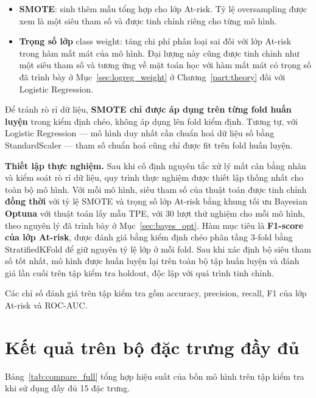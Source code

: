 \documentclass[a4paper]{report}
\newcommand{\code}[1]{{\ttfamily\def\_{\textunderscore\discretionary{}{}{}}#1}}
\def\code#1{#1}%
\def\_{ }%
\begin{document}
\begin{itemize}[leftmargin=*]
  \item \textbf{SMOTE}: sinh thêm
        mẫu tổng hợp cho lớp At-risk. Tỷ lệ oversampling được xem là một siêu
        tham số và được tinh chỉnh riêng cho từng mô hình.
  \item \textbf{Trọng số lớp} \code{class\_weight}: tăng chi phí phân loại
        sai đối với lớp At-risk trong hàm mất mát của mô hình. Đại lượng này
        cũng được tinh chỉnh như một siêu tham số và tương ứng về mặt toán học
        với hàm mất mát có trọng số đã trình bày ở
        Mục~\ref{sec:logreg_weight} ở Chương~\ref{part:theory} đối với
        Logistic Regression.
\end{itemize}

Để tránh rò rỉ dữ liệu, \textbf{SMOTE chỉ được áp dụng trên từng fold huấn
luyện} trong kiểm định chéo, không áp dụng lên fold kiểm định. Tương tự, với
Logistic Regression --- mô hình duy nhất cần chuẩn hoá dữ liệu số bằng
\code{StandardScaler} --- tham số chuẩn hoá cũng chỉ được fit trên fold huấn
luyện.

\medskip
\noindent\textbf{Thiết lập thực nghiệm.} Sau khi cố định nguyên tắc xử lý mất
cân bằng nhãn và kiểm soát rò rỉ dữ liệu,
quy trình thực nghiệm được thiết lập thống nhất cho toàn bộ mô hình. Với mỗi
mô hình, siêu tham số của thuật toán được tinh chỉnh \textbf{đồng thời}
với tỷ lệ SMOTE và trọng số lớp At-risk bằng khung tối ưu Bayesian
\textbf{Optuna} với thuật toán lấy mẫu TPE, với 30 lượt thử nghiệm cho mỗi mô
hình, theo nguyên lý đã trình bày ở Mục~\ref{sec:bayes_opt}. Hàm mục tiêu là
\textbf{F1-score của lớp At-risk}, được đánh giá bằng kiểm định chéo phân tầng
3-fold bằng \code{StratifiedKFold} để giữ nguyên tỷ lệ lớp ở mỗi fold. Sau khi xác định
bộ siêu tham số tốt nhất, mô hình được huấn luyện lại trên toàn bộ tập huấn
luyện và đánh giá lần cuối trên tập kiểm tra holdout, độc lập với
quá trình tinh chỉnh.

Các chỉ số đánh giá trên tập kiểm tra gồm accuracy, precision, recall, F1 của
lớp At-risk và ROC-AUC.

\section{Kết quả trên bộ đặc trưng đầy đủ}
\label{sec:compare_full}

Bảng~\ref{tab:compare_full} tổng hợp hiệu suất của bốn mô hình trên tập kiểm
tra khi sử dụng đầy đủ 15 đặc trưng.


\end{document}
